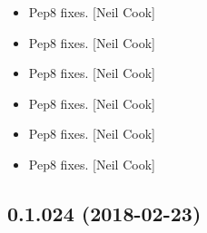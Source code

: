 \documentclass[a4paper,10pt,english]{report}
\begin{document}
\begin{itemize}
\item {} 
Pep8 fixes. {[}Neil Cook{]}

\item {} 
Pep8 fixes. {[}Neil Cook{]}

\item {} 
Pep8 fixes. {[}Neil Cook{]}

\item {} 
Pep8 fixes. {[}Neil Cook{]}

\item {} 
Pep8 fixes. {[}Neil Cook{]}

\item {} 
Pep8 fixes. {[}Neil Cook{]}

\end{itemize}


\subsection{0.1.024 (2018-02-23)}
\end{document}
